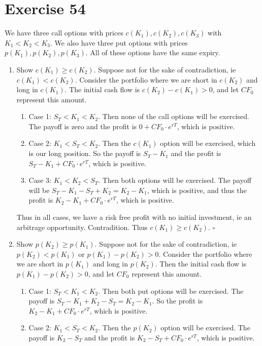 \documentclass{article}
\begin{document}
\section*{Exercise 54}
We have three call options with prices $c(K_1), c(K_2), c(K_3)$ with $K_1 < K_2 < K_3$.
We also have three put options with prices $p(K_1), p(K_2), p(K_3)$. All of these options have the same expiry.
\begin{enumerate}
    \item Show $c(K_1) \geq c(K_2)$. Suppose not for the sake of contradiction, ie $c(K_1) < c(K_2)$.
        Consider the portfolio where we are short in $c(K_2)$ and long in $c(K_1)$. The initial cash flow is $c(K_2) - c(K_1) > 0$, and let $CF_0$ represent this amount.
        \begin{enumerate}
            \item Case 1: $S_T < K_1 < K_2$. Then none of the call options will be exercised. The payoff is zero and the profit is $0 + CF_0 \cdot e^{rT}$, which is positive.
            \item Case 2: $K_1 < S_T < K_2$. Then the $c(K_1)$ option will be exercised, which is our long position. So the payoff is $S_T - K_1$ and the profit is $S_T - K_1 + CF_0 \cdot e^{rT}$, which is positive.
            \item Case 3: $K_1 < K_2 < S_T$. Then both options will be exercised. The payoff will be $S_T - K_1 - S_T + K_2 = K_2 - K_1$, which is positive, and thus the profit is $K_2 - K_1 + CF_0 \cdot e^{rT}$, which is positive.
        \end{enumerate}
        Thus in all cases, we have a risk free profit with no initial investment, ie an arbitrage opportunity. Contradition. Thus $c(K_1) \geq c(K_2)$. $\square$
    \item Show $p(K_2) \geq p(K_1)$. Suppose not for the sake of contradiction, ie $p(K_2) < p(K_1)$ or $p(K_1) - p(K_2) > 0$.
        Consider the portfolio where we are short in $p(K_1)$ and long in $p(K_2)$. Then the initial cash flow is $p(K_1) - p(K_2) > 0$, and let $CF_0$ represent this amount.
        \begin{enumerate}
            \item Case 1: $S_T < K_1 < K_2$. Then both put options will be exercised. The payoff is $S_T - K_1 + K_2 - S_T = K_2 - K_1$. So the profit is $K_2 - K_1 + CF_0 \cdot e^{rT}$, which is positive.
            \item Case 2: $K_1 < S_T < K_2$. Then the $p(K_2)$ option will be exercised. The payoff is $K_2 - S_T$ and the profit is $K_2 - S_T + CF_0 \cdot e^{rT}$, which is positive.

\end{enumerate}
\end{enumerate}
\end{document}
